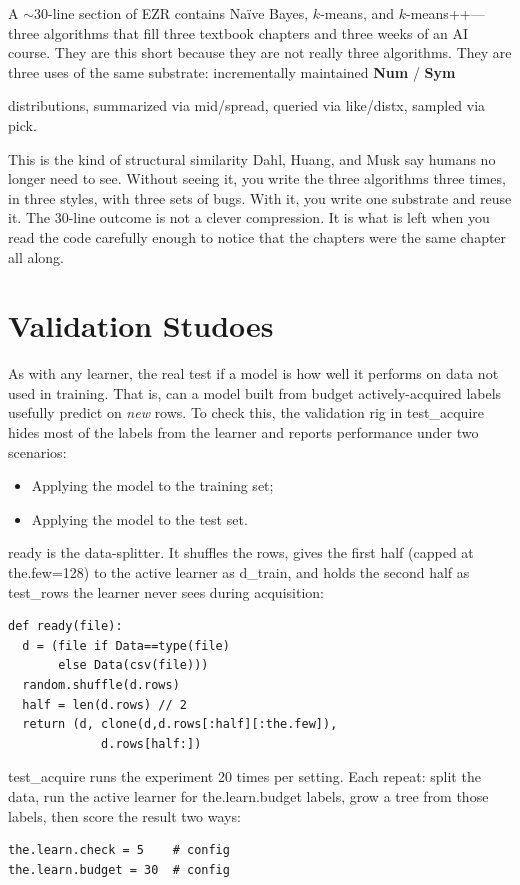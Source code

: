 \documentclass[AMA,STIX2COL]{WileyNJDv5}
\newcommand{\cls}[1]{%
  \setlength{\fboxsep}{1.5pt}%
  \colorbox{clsbg}{\sffamily\bfseries{#1}}%
}
\begin{document}
{A $\sim$30-line section of EZR contains Na\"ive Bayes, $k$-means,
and $k$-means++---three algorithms that fill three textbook chapters
and three weeks of an AI course. They are this short because they
are not really three algorithms. They are three uses of the same
substrate: incrementally maintained \cls{Num}/\cls{Sym}
distributions, summarized via \textsf{mid}/\textsf{spread}, queried
via \textsf{like}/\textsf{distx}, sampled via \textsf{pick}.

This is the kind of structural similarity Dahl, Huang, and Musk
say humans no longer need to see. Without seeing it, you write the
three algorithms three times, in three styles, with three sets of
bugs. With it, you write one substrate and reuse it. The
30-line outcome is not a clever compression. It is what is left
when you read the code carefully enough to notice that the
chapters were the same chapter all along.
\section{Validation Studoes}


As with any learner, the real test if a model
is how well it performs on data not used in training.
That is, can a  model built from
\textsf{budget} actively-acquired labels   usefully predict on
{\em new} rows. To check this, the validation rig in
\textsf{test\_acquire} hides most of the labels from the learner
and reports performance under two scenarios:
\begin{itemize}
\item Applying the model to the training set;
\item Applying the model to the test set.
\end{itemize}
\textsf{ready} is the data-splitter. It shuffles the rows, gives
the first half (capped at \textsf{the.few}=128) to the active
learner as \textsf{d\_train}, and holds the second half as
\textsf{test\_rows} the learner never sees during acquisition:
\begin{verbatim}
def ready(file): 
  d = (file if Data==type(file)
       else Data(csv(file)))
  random.shuffle(d.rows)
  half = len(d.rows) // 2
  return (d, clone(d,d.rows[:half][:the.few]),
             d.rows[half:])
\end{verbatim}
\textsf{test\_acquire} runs the experiment 20 times per setting.
Each repeat: split the data, run the active learner for
\textsf{the.learn.budget} labels, grow a tree from those labels,
then score the result two ways:
\begin{verbatim}
the.learn.check = 5    # config
the.learn.budget = 30  # config


\end{verbatim}}
\end{document}
